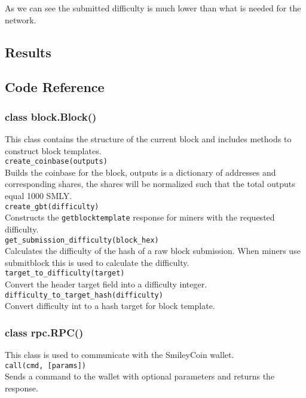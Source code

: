 As we can see the submitted difficulty is much lower than what is needed for the network. 

\subsection{Results}

\newpage

\subsection{Code Reference}

\subsubsection{class block.Block()}

This class contains the structure of the current block and includes methods to construct block templates. \\

\texttt{create\_coinbase(outputs)} \\

Builds the coinbase for the block, outputs is a dictionary of addresses and corresponding shares, the shares will be normalized such that the total outputs equal 1000 SMLY. \\

\texttt{create\_gbt(difficulty)} \\

Constructs the \texttt{getblocktemplate} response for miners with the requested difficulty. \\

\texttt{get\_submission\_difficulty(block\_hex)} \\

Calculates the difficulty of the hash of a raw block submission. When miners use submitblock this is used to calculate the difficulty. \\

\texttt{target\_to\_difficulty(target)}\\

Convert the header target field into a difficulty integer. \\

\texttt{difficulty\_to\_target\_hash(difficulty)}\\

Convert difficulty int to a hash target for block template. \\

\subsubsection{class rpc.RPC()}

This class is used to communicate with the SmileyCoin wallet. \\

\texttt{call(cmd, [params])}\\

Sends a command to the wallet with optional parameters and returns the response.
